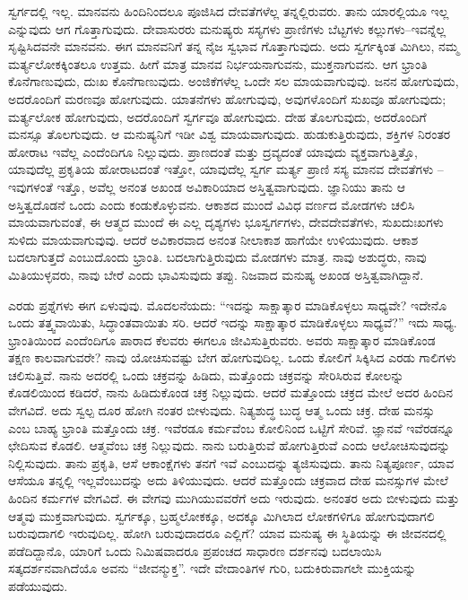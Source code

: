 ಸ್ವರ್ಗದಲ್ಲಿ ಇಲ್ಲ. ಮಾನವನು ಹಿಂದಿನಿಂದಲೂ ಪೂಜಿಸಿದ ದೇವತೆಗಳೆಲ್ಲ ತನ್ನಲ್ಲಿರುವರು. ತಾನು ಯಾರಲ್ಲಿಯೂ ಇಲ್ಲ ಎನ್ನುವುದು ಆಗ ಗೊತ್ತಾಗುವುದು. ದೇವಾಸುರರು ಮನುಷ್ಯರು ಸಸ್ಯಗಳು ಪ್ರಾಣಿಗಳು ಬೆಟ್ಟಗಳು ಕಲ್ಲುಗಳು–ಇವನ್ನೆಲ್ಲ ಸೃಷ್ಟಿಸಿದವನೇ ಮಾನವನು. ಈಗ ಮಾನವನಿಗೆ ತನ್ನ ನೈಜ ಸ್ವಭಾವ ಗೊತ್ತಾಗುವುದು. ಅದು ಸ್ವರ್ಗಕ್ಕಿಂತ ಮಿಗಿಲು, ನಮ್ಮ ಮರ್ತ್ಯಲೋಕಕ್ಕಿಂತಲೂ ಉತ್ತಮ. ಹೀಗೆ ಮಾತ್ರ ಮಾನವ ನಿರ್ಭಯನಾಗುವನು, ಮುಕ್ತನಾಗುವನು. ಆಗ ಭ್ರಾಂತಿ ಕೊನೆಗಾಣುವುದು, ದುಃಖ ಕೊನೆಗಾಣುವುದು. ಅಂಜಿಕೆಗಳೆಲ್ಲ ಒಂದೇ ಸಲ ಮಾಯವಾಗುವುವು. ಜನನ ಹೋಗುವುದು, ಅದರೊಂದಿಗೆ ಮರಣವೂ ಹೋಗುವುದು. ಯಾತನೆಗಳು ಹೋಗುವುವು, ಅವುಗಳೊಂದಿಗೆ ಸುಖವೂ ಹೋಗುವುದು; ಮರ್ತ್ಯಲೋಕ ಹೋಗುವುದು, ಅದರೊಂದಿಗೆ ಸ್ವರ್ಗವೂ ಹೋಗುವುದು. ದೇಹ ತೊಲಗುವುದು, ಅದರೊಂದಿಗೆ ಮನಸ್ಸೂ ತೊಲಗುವುದು. ಆ ಮನುಷ್ಯನಿಗೆ ಇಡೀ ವಿಶ್ವ ಮಾಯವಾಗುವುದು. ಹುಡುಕುತ್ತಿರುವುದು, ಶಕ್ತಿಗಳ ನಿರಂತರ ಹೋರಾಟ ಇವೆಲ್ಲ ಎಂದೆಂದಿಗೂ ನಿಲ್ಲುವುದು. ಪ್ರಾಣದಂತೆ ಮತ್ತು ದ್ರವ್ಯದಂತೆ ಯಾವುದು ವ್ಯಕ್ತವಾಗುತ್ತಿತ್ತೊ, ಯಾವುದೆಲ್ಲ ಪ್ರಕೃತಿಯ ಹೋರಾಟದಂತೆ ಇತ್ತೋ, ಯಾವುದೆಲ್ಲ ಸ್ವರ್ಗ ಮರ್ತ್ಯ ಪ್ರಾಣಿ ಸಸ್ಯ ಮಾನವ ದೇವತೆಗಳು – ಇವುಗಳಂತೆ ಇತ್ತೊ, ಅವೆಲ್ಲ ಅನಂತ ಅಖಂಡ ಅವಿಕಾರಿಯಾದ ಅಸ್ತಿತ್ವವಾಗುವುದು. ಜ್ಞಾನಿಯು ತಾನು ಆ ಅಸ್ತಿತ್ವದೊಡನೆ ಒಂದು ಎಂದು ಕಂಡುಕೊಳ್ಳುವನು. ಆಕಾಶದ ಮುಂದೆ ವಿವಿಧ ವರ್ಣದ ಮೋಡಗಳು ಚಲಿಸಿ ಮಾಯವಾಗುವಂತೆ, ಈ ಆತ್ಮದ ಮುಂದೆ ಈ ಎಲ್ಲ ದೃಶ್ಯಗಳು ಭೂಸ್ವರ್ಗಗಳು, ದೇವದೇವತೆಗಳು, ಸುಖದುಃಖಗಳು ಸುಳಿದು ಮಾಯವಾಗುವುವು. ಆದರೆ ಅವಿಕಾರವಾದ ಅನಂತ ನೀಲಾಕಾಶ ಹಾಗೆಯೇ ಉಳಿಯುವುದು. ಆಕಾಶ ಬದಲಾಗುತ್ತದೆ ಎಂಬುದೊಂದು ಭ್ರಾಂತಿ. ಬದಲಾಗುತ್ತಿರುವುದು ಮೋಡಗಳು ಮಾತ್ರ. ನಾವು ಅಶುದ್ಧರು, ನಾವು ಮಿತಿಯುಳ್ಳವರು, ನಾವು ಬೇರೆ ಎಂದು ಭಾವಿಸುವುದು ತಪ್ಪು. ನಿಜವಾದ ಮನುಷ್ಯ ಅಖಂಡ ಅಸ್ತಿತ್ವವಾಗಿದ್ದಾನೆ.

\vskip 0.2cm

ಎರಡು ಪ್ರಶ್ನೆಗಳು ಈಗ ಏಳುವುವು. ಮೊದಲನೆಯದು: “ಇದನ್ನು ಸಾಕ್ಷಾತ್ಕಾರ ಮಾಡಿಕೊಳ್ಳಲು ಸಾಧ್ಯವೇ? ಇದೇನೊ ಒಂದು ತತ್ತ್ವವಾಯಿತು, ಸಿದ್ಧಾಂತವಾಯಿತು ಸರಿ. ಆದರೆ ಇದನ್ನು ಸಾಕ್ಷಾತ್ಕಾರ ಮಾಡಿಕೊಳ್ಳಲು ಸಾಧ್ಯವೆ?” ಇದು ಸಾಧ್ಯ. ಭ್ರಾಂತಿಯಿಂದ ಎಂದೆಂದಿಗೂ ಪಾರಾದ ಕೆಲವರು ಈಗಲೂ ಜೀವಿಸುತ್ತಿರುವರು. ಅವರು ಸಾಕ್ಷಾತ್ಕಾರ ಮಾಡಿಕೊಂಡ ತಕ್ಷಣ ಕಾಲವಾಗುವರೇ? ನಾವು ಯೋಚಿಸುವಷ್ಟು ಬೇಗ ಹೋಗುವುದಿಲ್ಲ. ಒಂದು ಕೋಲಿಗೆ ಸಿಕ್ಕಿಸಿದ ಎರಡು ಗಾಲಿಗಳು ಚಲಿಸುತ್ತಿವೆ. ನಾನು ಅದರಲ್ಲಿ ಒಂದು ಚಕ್ರವನ್ನು ಹಿಡಿದು, ಮತ್ತೊಂದು ಚಕ್ರವನ್ನು ಸೇರಿಸಿರುವ ಕೋಲನ್ನು ಕೊಡಲಿಯಿಂದ ಕಡಿದರೆ, ನಾನು ಹಿಡಿದುಕೊಂಡ ಚಕ್ರ ನಿಲ್ಲುವುದು. ಆದರೆ ಮತ್ತೊಂದು ಚಕ್ರದ ಮೇಲೆ ಅದರ ಹಿಂದಿನ ವೇಗವಿದೆ. ಅದು ಸ್ವಲ್ಪ ದೂರ ಹೋಗಿ ನಂತರ ಬೀಳುವುದು. ನಿತ್ಯಶುದ್ಧ ಬುದ್ಧ ಆತ್ಮ ಒಂದು ಚಕ್ರ. ದೇಹ ಮನಸ್ಸು ಎಂಬ ಬಾಹ್ಯ ಭ್ರಾಂತಿ ಮತ್ತೊಂದು ಚಕ್ರ. ಇವೆರಡೂ ಕರ್ಮವೆಂಬ ಕೋಲಿನಿಂದ ಒಟ್ಟಿಗೆ ಸೇರಿವೆ. ಜ್ಞಾನವೆ ಇವೆರಡನ್ನೂ ಛೇದಿಸುವ ಕೊಡಲಿ. ಆತ್ಮವೆಂಬ ಚಕ್ರ ನಿಲ್ಲುವುದು. ನಾನು ಬರುತ್ತಿರುವೆ ಹೋಗುತ್ತಿರುವೆ ಎಂದು ಆಲೋಚಿಸುವುದನ್ನು ನಿಲ್ಲಿಸುವುದು. ತಾನು ಪ್ರಕೃತಿ, ಆಸೆ ಆಕಾಂಕ್ಷೆಗಳು ತನಗೆ ಇವೆ ಎಂಬುದನ್ನು ತ್ಯಜಿಸುವುದು. ತಾನು ನಿತ್ಯಪೂರ್ಣ, ಯಾವ ಆಸೆಯೂ ತನ್ನಲ್ಲಿ ಇಲ್ಲವೆಂಬುದನ್ನು ಅದು ತಿಳಿಯುವುದು. ಆದರೆ ಮತ್ತೊಂದು ಚಕ್ರವಾದ ದೇಹ ಮನಸ್ಸುಗಳ ಮೇಲೆ ಹಿಂದಿನ ಕರ್ಮಗಳ ವೇಗವಿದೆ. ಈ ವೇಗವು ಮುಗಿಯುವವರೆಗೆ ಅದು ಇರುವುದು. ಅನಂತರ ಅದು ಬೀಳುವುದು ಮತ್ತು ಆತ್ಮವು ಮುಕ್ತವಾಗುವುದು. ಸ್ವರ್ಗಕ್ಕೂ, ಬ್ರಹ್ಮಲೋಕಕ್ಕೂ, ಅದಕ್ಕೂ ಮಿಗಿಲಾದ ಲೋಕಗಳಿಗೂ ಹೋಗುವುದಾಗಲಿ ಬರುವುದಾಗಲಿ ಇರುವುದಿಲ್ಲ. ಹೋಗಿ ಬರುವುದಾದರೂ ಎಲ್ಲಿಗೆ? ಯಾವ ಮನುಷ್ಯ ಈ ಸ್ಥಿತಿಯನ್ನು ಈ ಜೀವನದಲ್ಲಿ ಪಡೆದಿದ್ದಾನೊ, ಯಾರಿಗೆ ಒಂದು ನಿಮಿಷವಾದರೂ ಪ್ರಪಂಚದ ಸಾಧಾರಣ ದರ್ಶನವು ಬದಲಾಯಿಸಿ ಸತ್ಕದರ್ಶನವಾಗಿದೆಯೊ ಅವನು “ಜೀವನ್ಮುಕ್ತ”. ಇದೇ ವೇದಾಂತಿಗಳ ಗುರಿ, ಬದುಕಿರುವಾಗಲೇ ಮುಕ್ತಿಯನ್ನು ಪಡೆಯುವುದು.

